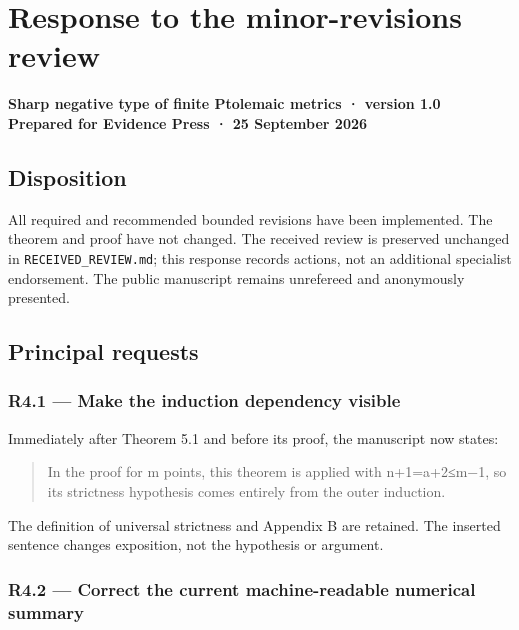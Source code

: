 \documentclass[
  10pt,
]{article}
\author{}
\date{}
\begin{document}
\section{Response to the minor-revisions
review}\label{response-to-the-minor-revisions-review}

\textbf{Sharp negative type of finite Ptolemaic metrics · version 1.0}\\
\textbf{Prepared for Evidence Press · 25 September 2026}

\subsection{Disposition}\label{disposition}

All required and recommended bounded revisions have been implemented.
The theorem and proof have not changed. The received review is preserved
unchanged in \texttt{RECEIVED\_REVIEW.md}; this response records
actions, not an additional specialist endorsement. The public manuscript
remains unrefereed and anonymously presented.

\subsection{Principal requests}\label{principal-requests}

\subsubsection{R4.1 --- Make the induction dependency
visible}\label{r4.1-make-the-induction-dependency-visible}

Immediately after Theorem 5.1 and before its proof, the manuscript now
states:

\begin{quote}
In the proof for m points, this theorem is applied with n+1=a+2≤m−1, so
its strictness hypothesis comes entirely from the outer induction.
\end{quote}

The definition of universal strictness and Appendix B are retained. The
inserted sentence changes exposition, not the hypothesis or argument.

\subsubsection{R4.2 --- Correct the current machine-readable numerical
summary}\label{r4.2-correct-the-current-machine-readable-numerical-summary}
\end{document}
